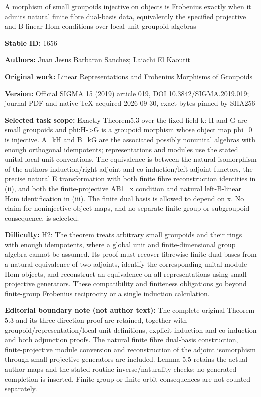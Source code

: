 \documentclass[11pt]{article}
\numberwithin{equation}{section}
\begin{document}
\begin{center}\Large A morphism of small groupoids injective on objects is Frobenius exactly when it admits natural finite fibre dual-basis data, equivalently the specified projective and B-linear Hom conditions over local-unit groupoid algebras\end{center}
\noindent\textbf{Stable ID:} 1656\par
\noindent\textbf{Authors:} Juan Jesus Barbaran Sanchez; Laiachi El Kaoutit\par
\noindent\textbf{Original work:} Linear Representations and Frobenius Morphisms of Groupoids\par
\noindent\textbf{Version:} Official SIGMA 15 (2019) article 019, DOI 10.3842/SIGMA.2019.019; journal PDF and native TeX acquired 2026-09-30, exact bytes pinned by SHA256\par
\noindent\textbf{Selected task scope:} Exactly Theorem5.3 over the fixed field k: H and G are small groupoids and phi:H->G is a groupoid morphism whose object map phi\_0 is injective. A=kH and B=kG are the associated possibly nonunital algebras with enough orthogonal idempotents; representations and modules use the stated unital local-unit conventions. The equivalence is between the natural isomorphism of the authors induction/right-adjoint and co-induction/left-adjoint functors, the precise natural E transformation with both finite fibre reconstruction identities in (ii), and both the finite-projective AB1\_x condition and natural left-B-linear Hom identification in (iii). The finite dual basis is allowed to depend on x. No claim for noninjective object maps, and no separate finite-group or subgroupoid consequence, is selected.\par
\noindent\textbf{Difficulty:} H2: The theorem treats arbitrary small groupoids and their rings with enough idempotents, where a global unit and finite-dimensional group algebra cannot be assumed. Its proof must recover fibrewise finite dual bases from a natural equivalence of two adjoints, identify the corresponding unital-module Hom objects, and reconstruct an equivalence on all representations using small projective generators. These compatibility and finiteness obligations go beyond finite-group Frobenius reciprocity or a single induction calculation.\par
\noindent\textbf{Editorial boundary note (not author text):} The complete original Theorem 5.3 and its three-direction proof are retained, together with groupoid/representation/local-unit definitions, explicit induction and co-induction and both adjunction proofs. The natural finite fibre dual-basis construction, finite-projective module conversion and reconstruction of the adjoint isomorphism through small projective generators are included. Lemma 5.5 retains the actual author maps and the stated routine inverse/naturality checks; no generated completion is inserted. Finite-group or finite-orbit consequences are not counted separately.\par
\end{document}
